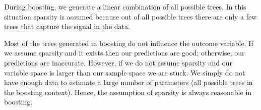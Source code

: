 \documentclass[11pt]{article}
\begin{document}
\vspace{5 mm}
\noindent
During boosting, we generate a linear combination of all possible trees. In 
this situation sparsity is assumed because out of all possible trees there are 
only a few trees that capture the signal in the data. 

\vspace{5 mm}
\noindent
Most of the trees generated in boosting do not influence the outcome variable. 
If we assume sparsity and it exists then our predictions are good; otherwise, 
our predictions are inaccurate. However, if we do not assume sparsity and 
our variable space is larger than our sample space we are stuck. We simply do 
not have enough data to estimate a large number of parameters (all possible 
trees in the boosting context). Hence, the assumption of sparsity is always 
reasonable in boosting.

\end{document}

